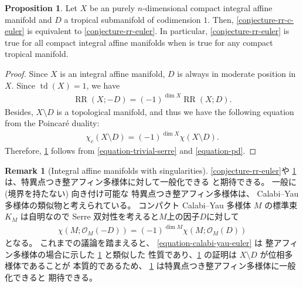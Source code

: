 \documentclass[a4paper,dvipdfmx,reqno,12pt]{amsart}
\theoremstyle{definition}
\newtheorem{proposition}[theorem]{Proposition}
\newtheorem{remark}[theorem]{Remark}
\newcommand{\opn}[1]{\operatorname{#1}}
\numberwithin{equation}{section}
\begin{document}
\begin{proposition}
\label{proposition-divisor-poincare}
Let $X$ be an purely 
$n$-dimensional compact integral
affine manifold and $D$ a tropical submanifold 
of codimension $1$.
Then, \cref{conjecture-rr-c-euler} is 
equivalent to
\cref{conjecture-rr-euler}. In particular,
\cref{conjecture-rr-euler} is true for
all compact integral affine manifolds when
\cite[Conjecture 6.13]{demedrano2023chern} is
true for any compact tropical manifold.
\end{proposition}
\begin{proof}
Since $X$ is an integral affine manifold,
$D$ is always in moderate position in $X$.
Since $\opn{td}(X)=1$, we have
\begin{align}
\label{equation-trivial-serre}
\opn{RR}(X;-D)=(-1)^{\dim X}\opn{RR}(X;D).
\end{align}
Besides, $X\setminus D$ is a topological manifold, 
and thus we have the following equation from 
the Poincar\'e duality:
\begin{align}
\label{equation-pd}
\chi_c(X\setminus D)=(-1)^{\dim X}\chi(X\setminus D).
\end{align}
Therefore, \cref{proposition-divisor-poincare} follows from
\cref{equation-trivial-serre} and
\cref{equation-pd}.
\end{proof}

\begin{remark}[{Integral affine manifolds with singularities}]
\label{remark-iass}
\cref{conjecture-rr-euler}や
\cref{proposition-divisor-poincare}
は、特異点つき整アフィン多様体に対して一般化できる
と期待できる。
一般に (境界を持たない) 向き付け可能な
特異点つき整アフィン多様体は、
Calabi--Yau 多様体の類似物と考えられている。
コンパクト Calabi--Yau 多様体 $M$ の標準束
$K_M$ は自明なので
Serre 双対性を考えると$M$上の因子$D$に対して
\begin{align}
\label{equation-calabi-yau-euler}
\chi(M;\mathcal{O}_M(-D))=(-1)^{\dim M}
\chi(M;\mathcal{O}_{M}(D))
\end{align}
となる。
これまでの議論を踏まえると、
\cref{equation-calabi-yau-euler} は
整アフィン多様体の場合に示した
\cref{proposition-divisor-poincare} と類似した
性質であり、\cref{proposition-divisor-poincare}
の証明は $X\setminus D$ が位相多様体であることが
本質的であるため、
\cref{proposition-divisor-poincare}
は特異点つき整アフィン多様体に一般化できると
期待できる。
\end{remark}
\end{document}
